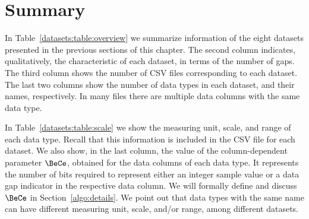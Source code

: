 
\vspace{-15pt}
\section{Summary}
\label{datasets:summary}


\vspace{-5pt}
In Table~\ref{datasets:table:overview} we summarize information of the eight datasets presented in the previous sections of this chapter. The second column indicates, qualitatively, the characteristic of each dataset, in terms of the number of gaps. The third column shows the number of CSV files corresponding to each dataset. The last two columns show the number of data types in each dataset, and their names, respectively. In many files there are multiple data columns with the same data type.





\clearpage



In Table~\ref{datasets:table:scale} we show the measuring unit, scale, and range of each data type. Recall that this information is included in the CSV file for each dataset. We also show, in the last column, the value of the column-dependent parameter $\BeCe$, obtained for the data columns of each data type. It represents the number of bits required to represent either an integer sample value or a data gap indicator in the respective data column. We will formally define and discuss $\BeCe$ in Section~\ref{algo:details}. We point out that data types with the same name can have different measuring unit, scale, and/or range, among different datasets. 

\vspace{+5pt}


